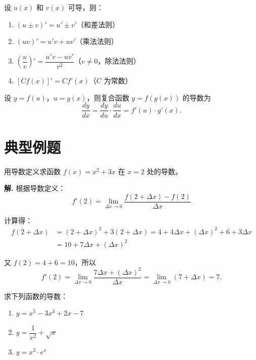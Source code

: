 \documentclass[11pt]{ctexrep}
\begin{document}
\begin{property}[导数的运算法则]
    设 $u(x)$ 和 $v(x)$ 可导，则：
    \begin{enumerate}
        \item $(u \pm v)' = u' \pm v'$（和差法则）
        \item $(uv)' = u'v + uv'$（乘法法则）
        \item $\left(\dfrac{u}{v}\right)' = \dfrac{u'v - uv'}{v^2}$（$v \neq 0$，除法法则）
        \item $[Cf(x)]' = Cf'(x)$（$C$ 为常数）
    \end{enumerate}
\end{property}

\begin{property}
    设 $y = f(u)$，$u = g(x)$，则复合函数 $y = f(g(x))$ 的导数为
    \[
        \frac{dy}{dx} = \frac{dy}{du} \cdot \frac{du}{dx} = f'(u) \cdot g'(x).
    \]
\end{property}

\section*{典型例题}

\begin{example}[利用定义求导数]
    用导数定义求函数 $f(x) = x^2 + 3x$ 在 $x = 2$ 处的导数。
\end{example}

\textbf{解.} 根据导数定义：
\[
    f'(2) = \lim_{\Delta x \to 0} \frac{f(2 + \Delta x) - f(2)}{\Delta x}
\]

计算得：
\begin{align*}
    f(2 + \Delta x) &= (2 + \Delta x)^2 + 3(2 + \Delta x) = 4 + 4\Delta x + (\Delta x)^2 + 6 + 3\Delta x \\ 
    &= 10 + 7\Delta x + (\Delta x)^2
\end{align*}

又 $f(2) = 4 + 6 = 10$，所以
\[
    f'(2) = \lim_{\Delta x \to 0} \frac{7\Delta x + (\Delta x)^2}{\Delta x} = \lim_{\Delta x \to 0} (7 + \Delta x) = 7.
\]

\begin{example}[基本函数的导数]
    求下列函数的导数：
    \begin{enumerate}
        \item $y = x^5 - 3x^3 + 2x - 7$
        \item $y = \dfrac{1}{x^2} + \sqrt{x}$
        \item $y = x^3 \cdot e^x$
    \end{enumerate}
\end{example}
\end{document}
